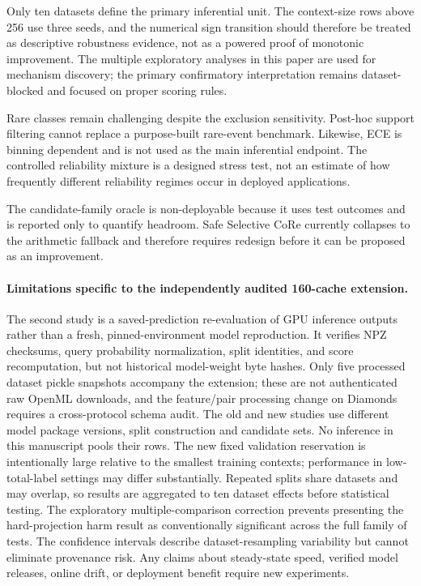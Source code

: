 \documentclass[a4paper,fleqn]{cas-sc}
\begin{document}
Only ten datasets define the primary inferential unit. The context-size rows above 256 use three seeds, and the numerical sign transition should therefore be treated as descriptive robustness evidence, not as a powered proof of monotonic improvement. The multiple exploratory analyses in this paper are used for mechanism discovery; the primary confirmatory interpretation remains dataset-blocked and focused on proper scoring rules.

Rare classes remain challenging despite the exclusion sensitivity. Post-hoc support filtering cannot replace a purpose-built rare-event benchmark. Likewise, ECE is binning dependent and is not used as the main inferential endpoint. The controlled reliability mixture is a designed stress test, not an estimate of how frequently different reliability regimes occur in deployed applications.

The candidate-family oracle is non-deployable because it uses test outcomes and is reported only to quantify headroom. Safe Selective CoRe currently collapses to the arithmetic fallback and therefore requires redesign before it can be proposed as an improvement.


\paragraph{Limitations specific to the independently audited 160-cache extension.}
The second study is a saved-prediction re-evaluation of GPU inference outputs rather than a fresh, pinned-environment model reproduction. It verifies NPZ checksums, query probability normalization, split identities, and score recomputation, but not historical model-weight byte hashes. Only five processed dataset pickle snapshots accompany the extension; these are not authenticated raw OpenML downloads, and the feature/pair processing change on Diamonds requires a cross-protocol schema audit. The old and new studies use different model package versions, split construction and candidate sets. No inference in this manuscript pools their rows. The new fixed validation reservation is intentionally large relative to the smallest training contexts; performance in low-total-label settings may differ substantially. Repeated splits share datasets and may overlap, so results are aggregated to ten dataset effects before statistical testing. The exploratory multiple-comparison correction prevents presenting the hard-projection harm result as conventionally significant across the full family of tests. The confidence intervals describe dataset-resampling variability but cannot eliminate provenance risk. Any claims about steady-state speed, verified model releases, online drift, or deployment benefit require new experiments.
\end{document}
